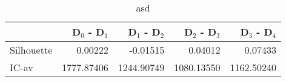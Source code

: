 \begin{table}
\centering
\caption{asd}
\label{tab:delmh-orig-pivotbi-combined}
\begin{tabular}{lrrrr}
\toprule
{} &  D$_0$ - D$_1$ &  D$_1$ - D$_2$ &  D$_2$ - D$_3$ &  D$_3$ - D$_4$ \\
\midrule
Silhouette &        0.00222 &       -0.01515 &        0.04012 &        0.07433 \\
IC-av      &     1777.87406 &     1244.90749 &     1080.13550 &     1162.50240 \\
\bottomrule
\end{tabular}
\end{table}

